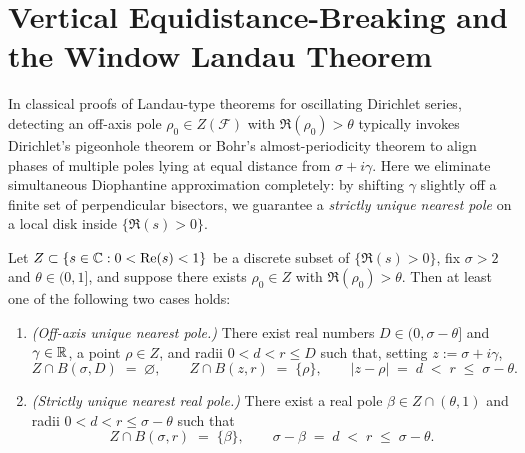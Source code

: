 \section{Vertical Equidistance-Breaking and the Window Landau Theorem}
\label{sec:02:landau-proof}

In classical proofs of Landau-type theorems for oscillating Dirichlet series, detecting an off-axis pole $\rho_0 \in Z(\mathcal{F})$ with $\Re(\rho_0) > \theta$ typically invokes Dirichlet's pigeonhole theorem or Bohr's almost-periodicity theorem to align phases of multiple poles lying at equal distance from $\sigma + i\gamma$. Here we eliminate simultaneous Diophantine approximation completely: by shifting $\gamma$ slightly off a finite set of perpendicular bisectors, we guarantee a \emph{strictly unique nearest pole} on a local disk inside $\{\Re(s) > 0\}$.

\begin{proposition}
\label{prop:02:dichotomy}
Let $Z \subset \{s \in \mathbb{C} : 0 < \operatorname{Re}(s) < 1\}$ be a discrete subset of $\{\Re(s) > 0\}$, fix $\sigma > 2$ and $\theta \in (0, 1]$, and suppose there exists $\rho_0 \in Z$ with $\Re(\rho_0) > \theta$. Then at least one of the following two cases holds:
\begin{enumerate}[label=\textup{\textbf{Case~\Roman*.}}]
\item \emph{(Off-axis unique nearest pole.)} There exist real numbers $D \in (0, \sigma - \theta]$ and $\gamma \in \mathbb{R}$, a point $\rho \in Z$, and radii $0 < d < r \le D$ such that, setting $z := \sigma + i\gamma$,
  \[
    Z \cap B(\sigma, D) \;=\; \varnothing, \qquad Z \cap B(z, r) \;=\; \{\rho\}, \qquad |z - \rho| \;=\; d \;<\; r \;\le\; \sigma - \theta.
  \]
\item \emph{(Strictly unique nearest real pole.)} There exist a real pole $\beta \in Z \cap (\theta, 1)$ and radii $0 < d < r \le \sigma - \theta$ such that
  \[
    Z \cap B(\sigma, r) \;=\; \{\beta\}, \qquad \sigma - \beta \;=\; d \;<\; r \;\le\; \sigma - \theta.
  \]
\end{enumerate}
\end{proposition}

